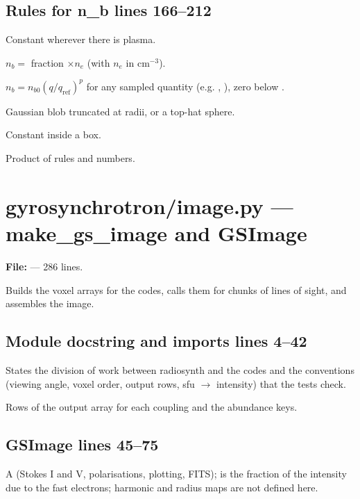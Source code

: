 \section*{\normalsize Rules for n\_b \hfill{\small\mdseries\color{gray}lines 166--212}}

\begin{lines}
\item[L.166] Constant wherever there is plasma.
\item[L.171] $n_b=$ fraction $\times n_e$ (with $n_e$ in cm$^{-3}$).
\item[L.176] $n_b=n_{b0}(q/q_\text{ref})^p$ for any sampled quantity (e.g. , ), zero below .
\item[L.185] Gaussian blob truncated at  radii, or a top-hat sphere.
\item[L.199] Constant inside a box.
\item[L.205] Product of rules and numbers.
\end{lines}

\chapter{gyrosynchrotron/image.py --- make\_gs\_image and GSImage}
\label{mod:gyrosynchrotron:image.py}
\textbf{File:}  --- 286 lines.

Builds the voxel arrays for the codes, calls them for chunks of lines of sight, and
assembles the image.

\section*{\normalsize Module docstring and imports \hfill{\small\mdseries\color{gray}lines 4--42}}

States the division of work between radiosynth and the codes and the conventions (viewing angle, voxel order, output rows, sfu $\to$ intensity) that the tests check.

\begin{lines}
\item[L.41–42] Rows of the output array for each coupling and the abundance keys.
\end{lines}
\section*{\normalsize GSImage \hfill{\small\mdseries\color{gray}lines 45--75}}

A  (Stokes I and V, polarisations, plotting, FITS);  is the fraction of the intensity due to the fast electrons; harmonic and radius maps are not defined here.

